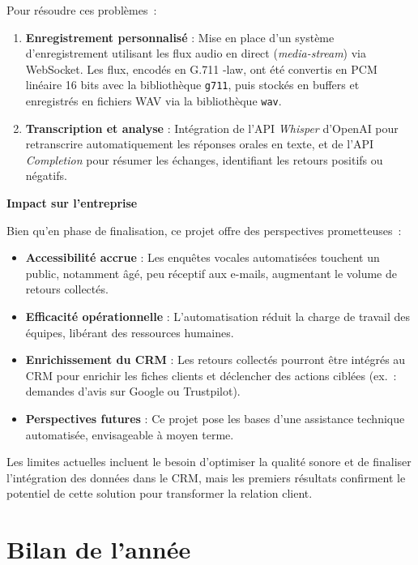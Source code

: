 Pour résoudre ces problèmes~:

\begin{enumerate}
    \item \textbf{Enregistrement personnalisé} : Mise en place d’un système d’enregistrement utilisant les flux audio en direct (\textit{media-stream}) via WebSocket. Les flux, encodés en G.711 \textmu-law, ont été convertis en PCM linéaire 16 bits avec la bibliothèque \texttt{g711}, puis stockés en buffers et enregistrés en fichiers WAV via la bibliothèque \texttt{wav}.
    \item \textbf{Transcription et analyse} : Intégration de l’API \textit{Whisper} d’OpenAI pour retranscrire automatiquement les réponses orales en texte, et de l’API \textit{Completion} pour résumer les échanges, identifiant les retours positifs ou négatifs.
\end{enumerate}

\textbf{Impact sur l’entreprise}

Bien qu’en phase de finalisation, ce projet offre des perspectives prometteuses~:

\begin{itemize}
    \item \textbf{Accessibilité accrue} : Les enquêtes vocales automatisées touchent un public, notamment âgé, peu réceptif aux e-mails, augmentant le volume de retours collectés.
    \item \textbf{Efficacité opérationnelle} : L’automatisation réduit la charge de travail des équipes, libérant des ressources humaines.
    \item \textbf{Enrichissement du CRM} : Les retours collectés pourront être intégrés au CRM pour enrichir les fiches clients et déclencher des actions ciblées (ex.~: demandes d’avis sur Google ou Trustpilot).
    \item \textbf{Perspectives futures} : Ce projet pose les bases d’une assistance technique automatisée, envisageable à moyen terme.
\end{itemize}

Les limites actuelles incluent le besoin d’optimiser la qualité sonore et de finaliser l’intégration des données dans le CRM, mais les premiers résultats confirment le potentiel de cette solution pour transformer la relation client.






\section{Bilan de l’année}
\label{bilan}

